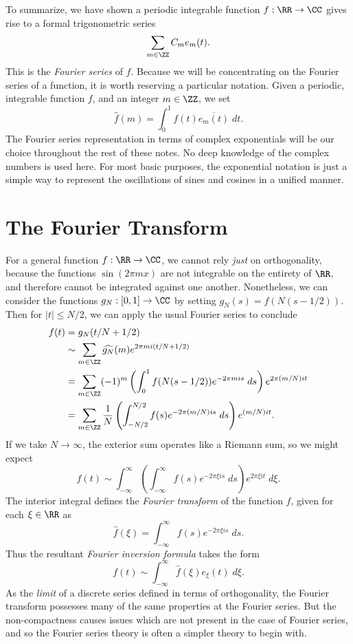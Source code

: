To summarize, we have shown a periodic integrable function $f: \RR \to \CC$ gives rise to a formal trigonometric series
%
\[ \sum_{m \in \ZZ} C_m e_m(t). \]
%
This is the \emph{Fourier series} of $f$. Because we will be concentrating on the Fourier series of a function, it is worth reserving a particular notation. Given a periodic, integrable function $f$, and an integer $m \in \ZZ$, we set
%
\[ \widehat{f}(m) = \int_0^1 f(t) \overline{e_m(t)}\; dt. \]
%
The Fourier series representation in terms of complex exponentials will be our choice throughout the rest of these notes. No deep knowledge of the complex numbers is used here. For most basic purposes, the exponential notation is just a simple way to represent the oscillations of sines and cosines in a unified manner.

\section{The Fourier Transform}

For a general function $f: \RR \to \CC$, we cannot rely \emph{just} on orthogonality, because the functions $\sin(2 \pi mx)$ are not integrable on the entirety of $\RR$, and therefore cannot be integrated against one another. Nonetheless, we can consider the functions $g_N: [0,1] \to \CC$ by setting $g_N(s) = f(N(s-1/2))$. Then for $|t| \leq N/2$, we can apply the usual Fourier series to conclude
%
\begin{align*}
    f(t) &= g_N(t/N+1/2)\\
    &\sim \sum_{m \in \ZZ} \widehat{g_N}(m) e^{2 \pi m i (t/N + 1/2)}\\
    &=  \sum_{m \in \ZZ} (-1)^m \left( \int_0^1 f(N(s-1/2)) e^{-2 \pi mis}\; ds \right) e^{2 \pi (m/N) it}\\
    &= \sum_{m \in \ZZ} \frac{1}{N} \left( \int_{-N/2}^{N/2} f(s) e^{-2\pi (m/N) i s}\; ds \right) e^{(m/N)it}.
\end{align*}
%
If we take $N \to \infty$, the exterior sum operates like a Riemann sum, so we might expect
%
\[ f(t) \sim \int_{-\infty}^\infty \left( \int_{-\infty}^\infty f(s) e^{-2 \pi \xi is}\; ds \right) e^{2 \pi \xi i t}\; d\xi. \]
%
The interior integral defines the \emph{Fourier transform} of the function $f$, given for each $\xi \in \RR$ as
%
\[ \widehat{f}(\xi) = \int_{-\infty}^\infty f(s) e^{- 2 \pi \xi is}\; ds. \]
%
Thus the resultant \emph{Fourier inversion formula} takes the form
%
\[ f(t) \sim \int_{-\infty}^\infty \widehat{f}(\xi) e_\xi(t)\; d\xi. \]
%
As the \emph{limit} of a discrete series defined in terms of orthogonality, the Fourier transform possesses many of the same properties at the Fourier series. But the non-compactness causes issues which are not present in the case of Fourier series, and so the Fourier series theory is often a simpler theory to begin with.

